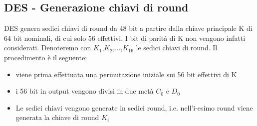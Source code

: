 \subsection{DES - Generazione chiavi di round}
DES genera sedici chiavi di round da 48 bit a partire dalla chiave principale K di 64 bit nominali, di cui solo 56 effettivi. I bit di parità di K non vengono infatti considerati. Denoteremo con $K_{1}$,$K_{2}$,...,$K_{16}$ le sedici chiavi di round. Il procedimento è il seguente:
\begin{itemize}
  \item viene prima effettuata una permutazione iniziale sui 56 bit effettivi di K
  \item i 56 bit in output vengono divisi in due metà $C_{0}$ e $D_{0}$
  \item Le sedici chiavi vengono generate in sedici round, i.e. nell'i-esimo round viene generata la chiave di round $K_{i}$
\end{itemize}
